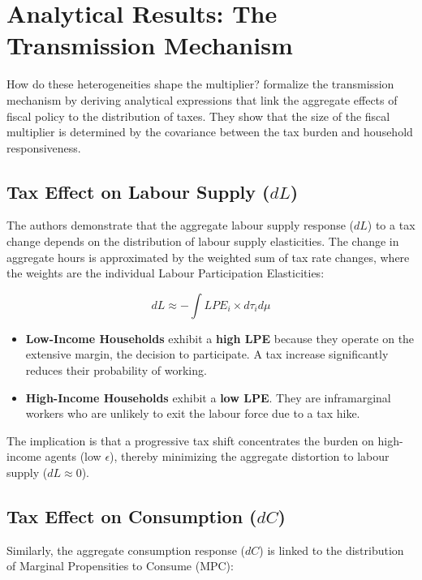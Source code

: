\documentclass[12pt,letterpaper]{article}
\begin{document}
\section{Analytical Results: The Transmission Mechanism}

How do these heterogeneities shape the multiplier?  \cite{FN} formalize the transmission mechanism by deriving analytical expressions that link the aggregate effects of fiscal policy to the distribution of taxes. They show that the size of the fiscal multiplier is determined by the covariance between the tax burden and household responsiveness.

\subsection{Tax Effect on Labour Supply ($dL$)}
The authors demonstrate that the aggregate labour supply response ($dL$) to a tax change depends on the distribution of labour supply elasticities. The change in aggregate hours is approximated by the weighted sum of tax rate changes, where the weights are the individual Labour Participation Elasticities:

\begin{equation}
    dL \approx - \int LPE_{i} \times d\tau_{i} d\mu
    \label{eq:labour_response}
\end{equation}

\begin{itemize}
    \item \textbf{Low-Income Households} exhibit a \textbf{high LPE} because they operate on the extensive margin, the decision to participate. A tax increase significantly reduces their probability of working.
    \item \textbf{High-Income Households} exhibit a \textbf{low LPE}. They are inframarginal workers who are unlikely to exit the labour force due to a tax hike.
\end{itemize}

The implication is that a progressive tax shift concentrates the burden on high-income agents (low $\epsilon$), thereby minimizing the aggregate distortion to labour supply ($dL \approx 0$).

\subsection{Tax Effect on Consumption ($dC$)}
Similarly, the aggregate consumption response ($dC$) is linked to the distribution of Marginal Propensities to Consume (MPC):
\end{document}
